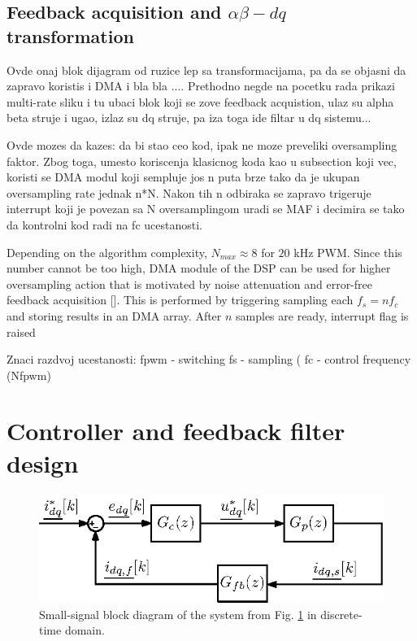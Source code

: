 \documentclass[journal]{IEEEtran}
\begin{document}
\subsection{Feedback acquisition and $\alpha \beta - dq$ transformation}
Ovde onaj blok dijagram od ruzice lep sa transformacijama, pa da se objasni da zapravo koristis i DMA i bla bla .... Prethodno negde na pocetku rada prikazi multi-rate sliku i tu ubaci blok koji se zove feedback acquistion, ulaz su alpha beta struje i ugao, izlaz su dq struje, pa iza toga ide filtar u dq sistemu...

Ovde mozes da kazes: da bi stao ceo kod, ipak ne moze preveliki oversampling faktor. Zbog toga, umesto koriscenja klasicnog koda kao u subsection koji vec, koristi se DMA modul koji sempluje jos n puta brze tako da je ukupan oversampling rate jednak n*N. Nakon tih n odbiraka se zapravo trigeruje interrupt koji je povezan sa N oversamplingom uradi se MAF i decimira se tako da kontrolni kod radi na fc ucestanosti.

Depending on the algorithm complexity, $N_{max} \approx 8$ for $20$ kHz PWM. Since this number cannot be too high, DMA module of the DSP can be used for higher oversampling action that is motivated by noise attenuation and error-free feedback acquisition []. This is performed by triggering sampling each $f_s = nf_c$ and storing results in an DMA array. After $n$ samples are ready, interrupt flag is raised 

Znaci razdvoj ucestanosti:
fpwm - switching
fs - sampling (
fc - control frequency (Nfpwm)

\section{Controller and feedback filter design}

\begin{figure}[t!]
    \centerline{\includegraphics[width=0.95\linewidth]{figures/small_signal.eps}}
    \caption{Small-signal block diagram of the system from Fig. \ref{fig:MSControl} in discrete-time domain.}
    \label{fig:MSControl}
\end{figure}
\end{document}
